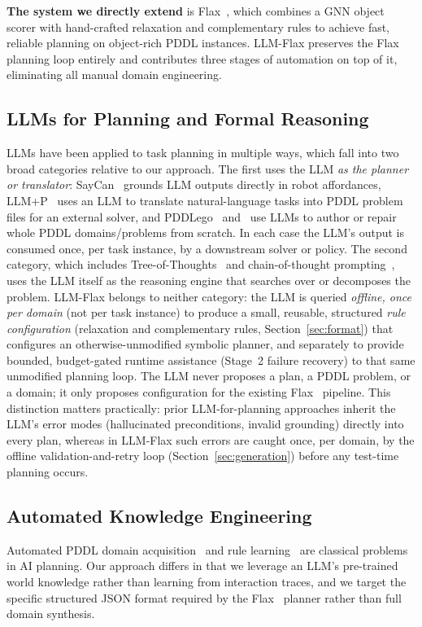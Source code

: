 \documentclass[letterpaper, 10pt, journal, twoside]{IEEEtran}
\newcommand{\sref}[1]{Section~\ref{#1}}
\newcommand{\method}{LLM-Flax\xspace}
\begin{document}
\textbf{The system we directly extend} is Flax~\cite{du2026fast}, which combines a GNN object scorer with hand-crafted relaxation and complementary rules to achieve fast, reliable planning on object-rich PDDL instances.
\method preserves the Flax planning loop entirely and contributes three stages of automation on top of it, eliminating all manual domain engineering.

\subsection{LLMs for Planning and Formal Reasoning}
LLMs have been applied to task planning in multiple ways, which fall into two broad categories relative to our approach.
The first uses the LLM \emph{as the planner or translator}: SayCan~\cite{ahn2022can} grounds LLM outputs directly in robot affordances, LLM+P~\cite{liu2023llm+} uses an LLM to translate natural-language tasks into PDDL problem files for an external solver, and PDDLego~\cite{zhang2023pddl} and~\cite{guan2023leveraging} use LLMs to author or repair whole PDDL domains/problems from scratch.
In each case the LLM's output is consumed once, per task instance, by a downstream solver or policy.
The second category, which includes Tree-of-Thoughts~\cite{yao2023tree} and chain-of-thought prompting~\cite{wei2022chain}, uses the LLM itself as the reasoning engine that searches over or decomposes the problem.
\method belongs to neither category: the LLM is queried \emph{offline, once per domain} (not per task instance) to produce a small, reusable, structured \emph{rule configuration} (relaxation and complementary rules, \sref{sec:format}) that configures an otherwise-unmodified symbolic planner, and separately to provide bounded, budget-gated runtime assistance (Stage~2 failure recovery) to that same unmodified planning loop.
The LLM never proposes a plan, a PDDL problem, or a domain; it only proposes configuration for the existing Flax~\cite{du2026fast} pipeline.
This distinction matters practically: prior LLM-for-planning approaches inherit the LLM's error modes (hallucinated preconditions, invalid grounding) directly into every plan, whereas in \method such errors are caught once, per domain, by the offline validation-and-retry loop (\sref{sec:generation}) before any test-time planning occurs.

\subsection{Automated Knowledge Engineering}
Automated PDDL domain acquisition~\cite{cresswell2013acquiring} and rule learning~\cite{law2019inductive} are classical problems in AI planning.
Our approach differs in that we leverage an LLM's pre-trained world knowledge rather than learning from interaction traces, and we target the specific structured JSON format required by the Flax~\cite{du2026fast} planner rather than full domain synthesis.
\end{document}
